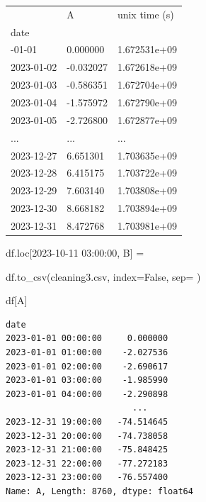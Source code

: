 \documentclass[
  letterpaper,
  DIV=11,
  numbers=noendperiod,
  oneside]{scrreprt}
\newenvironment{Shaded}{\begin{snugshade}}{\end{snugshade}}
\newcommand{\NormalTok}[1]{\textcolor[rgb]{0.00,0.23,0.31}{#1}}
\newcommand{\OperatorTok}[1]{\textcolor[rgb]{0.37,0.37,0.37}{#1}}
\newcommand{\StringTok}[1]{\textcolor[rgb]{0.13,0.47,0.30}{#1}}
\newcommand{\VariableTok}[1]{\textcolor[rgb]{0.07,0.07,0.07}{#1}}
\begin{document}
\begin{longtable}[]{@{}lll@{}}
\toprule\noalign{}
& A & unix time (s) \\
date & & \\
\midrule\noalign{}
\endhead
\bottomrule\noalign{}
\endlastfoot
2023-01-01 & 0.000000 & 1.672531e+09 \\
2023-01-02 & -0.032027 & 1.672618e+09 \\
2023-01-03 & -0.586351 & 1.672704e+09 \\
2023-01-04 & -1.575972 & 1.672790e+09 \\
2023-01-05 & -2.726800 & 1.672877e+09 \\
... & ... & ... \\
2023-12-27 & 6.651301 & 1.703635e+09 \\
2023-12-28 & 6.415175 & 1.703722e+09 \\
2023-12-29 & 7.603140 & 1.703808e+09 \\
2023-12-30 & 8.668182 & 1.703894e+09 \\
2023-12-31 & 8.472768 & 1.703981e+09 \\
\end{longtable}

\begin{Shaded}
\begin{Highlighting}[]
\NormalTok{df.loc[}\StringTok{\textquotesingle{}2023{-}10{-}11 03:00:00\textquotesingle{}}\NormalTok{, }\StringTok{\textquotesingle{}B\textquotesingle{}}\NormalTok{] }\OperatorTok{=} \StringTok{\textquotesingle{}{-}\textquotesingle{}}
\end{Highlighting}
\end{Shaded}

\begin{Shaded}
\begin{Highlighting}[]
\NormalTok{df.to\_csv(}\StringTok{\textquotesingle{}cleaning3.csv\textquotesingle{}}\NormalTok{, index}\OperatorTok{=}\VariableTok{False}\NormalTok{, sep}\OperatorTok{=}\StringTok{\textquotesingle{} \textquotesingle{}}\NormalTok{)}
\end{Highlighting}
\end{Shaded}

\begin{Shaded}
\begin{Highlighting}[]
\NormalTok{df[}\StringTok{\textquotesingle{}A\textquotesingle{}}\NormalTok{]}
\end{Highlighting}
\end{Shaded}

\begin{verbatim}
date
2023-01-01 00:00:00     0.000000
2023-01-01 01:00:00    -2.027536
2023-01-01 02:00:00    -2.690617
2023-01-01 03:00:00    -1.985990
2023-01-01 04:00:00    -2.290898
                         ...    
2023-12-31 19:00:00   -74.514645
2023-12-31 20:00:00   -74.738058
2023-12-31 21:00:00   -75.848425
2023-12-31 22:00:00   -77.272183
2023-12-31 23:00:00   -76.557400
Name: A, Length: 8760, dtype: float64
\end{verbatim}
\end{document}
